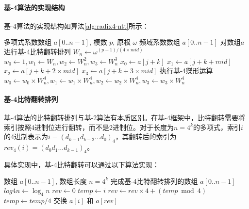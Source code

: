 \documentclass[a4paper]{article}
\begin{document}
\paragraph{基-4算法的实现结构} 基-4算法的实现结构如算法\ref{alg:radix4-ntt}所示：

\begin{algorithm}[htbp]
\caption{基-4 NTT前向变换算法}
\label{alg:radix4-ntt}
\begin{algorithmic}[1]
\Require 多项式系数数组 $a[0..n-1]$, 模数 $p$, 原根 $\omega$
\Ensure 频域系数数组 $a[0..n-1]$
\State 对数组$a$进行基-4比特翻转排列
    \State $W_n \gets \omega^{(p-1)/(4 \times mid)}$
        \State $w_0 \gets 1, w_1 \gets W_n, w_2 \gets W_n^2, w_3 \gets W_n^3$
            \State $x_0 \gets a[j + k]$
            \State $x_1 \gets a[j + k + mid]$
            \State $x_2 \gets a[j + k + 2 \times mid]$
            \State $x_3 \gets a[j + k + 3 \times mid]$
            \State 执行基-4蝶形运算
            \State $w_0 \gets w_0 \times W_n^4, w_1 \gets w_1 \times W_n^4, w_2 \gets w_2 \times W_n^4, w_3 \gets w_3 \times W_n^4$
        \EndFor
    \EndFor
\EndFor
\end{algorithmic}
\end{algorithm}

\paragraph{基-4比特翻转排列} 基-4算法的比特翻转排列与基-2算法有本质区别。在基-4框架中，比特翻转需要将索引按照4进制位进行翻转，而不是2进制位。对于长度为$n = 4^k$的多项式，索引$i$的4进制表示为$i = (d_{k-1}d_{k-2}\ldots d_0)_4$，其翻转后的索引为$rev_4(i) = (d_0d_1\ldots d_{k-1})_4$。

具体实现中，基-4比特翻转可以通过以下算法实现：

\begin{algorithm}[htbp]
\caption{基-4比特翻转排列算法}
\label{alg:radix4-bitreverse}
\begin{algorithmic}[1]
\Require 数组 $a[0..n-1]$, 数组长度 $n = 4^k$
\Ensure 完成基-4比特翻转排列的数组 $a[0..n-1]$
\State $log4n \gets \log_4 n$
    \State $rev \gets 0$
    \State $temp \gets i$
        \State $rev \gets rev \times 4 + (temp \bmod 4)$
        \State $temp \gets temp / 4$
    \EndFor
        \State 交换 $a[i]$ 和 $a[rev]$
    \EndIf
\EndFor
\end{algorithmic}
\end{algorithm}
\end{document}
